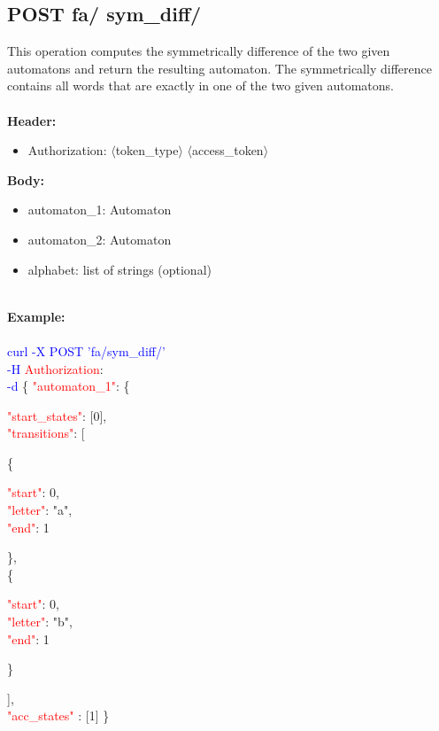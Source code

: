 \subsection{POST fa/ sym\_diff/}
This operation computes the symmetrically difference of the two given automatons and return the resulting automaton. The symmetrically difference contains all words that are exactly in one of the two given automatons.  \\
\ \\
\textbf{Header:}
\begin{itemize}
    \item Authorization: $\langle$token\_type$\rangle$ $\langle$access\_token$\rangle$
\end{itemize}
\textbf{Body:}
\ \\
\begin{itemize}
    \item automaton\_1: Automaton
     \item automaton\_2: Automaton
    \item alphabet: list of strings (optional)
\end{itemize}
\ \\
\textbf{Example:} \\
\ \\
\textcolor{blue}{curl -X POST '\BaseURL fa/sym\_diff/'\\
-H} \textcolor{red}{Authorization}: \Auth \\
\textcolor{blue}{-d} \{ 
     \textcolor{red}{"automaton\_1"}: \{
     \begin{adjustwidth}{7.5 mm}{0 cm}
     \begin{adjustwidth}{7.5 mm}{0 cm}
            \textcolor{red}{"start\_states"}: [0],\\
            \textcolor{red}{"transitions"}: [
            \begin{adjustwidth}{7.5 mm}{0 cm}
            \{
               \begin{adjustwidth}{7.5 mm}{0 cm}
                    \textcolor{red}{"start"}: 0,\\
                    \textcolor{red}{"letter"}: "a",\\
                    \textcolor{red}{"end"}: 1
               \end{adjustwidth}
            \},\\
            \{
               \begin{adjustwidth}{7.5 mm}{0 cm}
                    \textcolor{red}{"start"}: 0,\\
                    \textcolor{red}{"letter"}: "b",\\
                    \textcolor{red}{"end"}: 1
               \end{adjustwidth}
            \}
            \end{adjustwidth}
            ],\\
        \textcolor{red}{"acc\_states" }: [1]  \}
    \end{adjustwidth}
    \end{adjustwidth}
